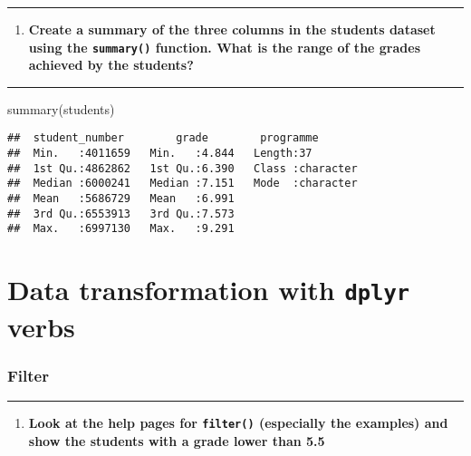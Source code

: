\documentclass[
]{article}
\newenvironment{Shaded}{\begin{snugshade}}{\end{snugshade}}
\newcommand{\FunctionTok}[1]{\textcolor[rgb]{0.00,0.00,0.00}{#1}}
\newcommand{\NormalTok}[1]{#1}
\providecommand{\tightlist}{%
  \setlength{\itemsep}{0pt}\setlength{\parskip}{0pt}}
\begin{document}
\begin{center}\rule{0.5\linewidth}{0.5pt}\end{center}

\begin{enumerate}
\def\labelenumi{\arabic{enumi}.}
\setcounter{enumi}{9}
\tightlist
\item
  \textbf{Create a summary of the three columns in the students dataset
  using the \texttt{summary()} function. What is the range of the grades
  achieved by the students?}
\end{enumerate}

\begin{center}\rule{0.5\linewidth}{0.5pt}\end{center}

\begin{Shaded}
\begin{Highlighting}[]
\FunctionTok{summary}\NormalTok{(students)}
\end{Highlighting}
\end{Shaded}

\begin{verbatim}
##  student_number        grade        programme        
##  Min.   :4011659   Min.   :4.844   Length:37         
##  1st Qu.:4862862   1st Qu.:6.390   Class :character  
##  Median :6000241   Median :7.151   Mode  :character  
##  Mean   :5686729   Mean   :6.991                     
##  3rd Qu.:6553913   3rd Qu.:7.573                     
##  Max.   :6997130   Max.   :9.291
\end{verbatim}

\hypertarget{data-transformation-with-dplyr-verbs}{%
\section{\texorpdfstring{Data transformation with \texttt{dplyr}
verbs}{Data transformation with dplyr verbs}}\label{data-transformation-with-dplyr-verbs}}

\hypertarget{filter}{%
\subsubsection{Filter}\label{filter}}

\begin{center}\rule{0.5\linewidth}{0.5pt}\end{center}

\begin{enumerate}
\def\labelenumi{\arabic{enumi}.}
\setcounter{enumi}{10}
\tightlist
\item
  \textbf{Look at the help pages for \texttt{filter()} (especially the
  examples) and show the students with a grade lower than 5.5}
\end{enumerate}
\end{document}
